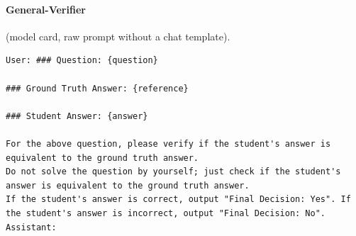 \documentclass[11pt]{article}
\begin{document}
\par\addvspace{2ex}\noindent\begin{minipage}{\columnwidth}
\paragraph{General-Verifier} (model card, raw prompt without a chat template).
\begin{Verbatim}[breaklines, breakanywhere, fontsize=\scriptsize, frame=single]
User: ### Question: {question}

### Ground Truth Answer: {reference}

### Student Answer: {answer}

For the above question, please verify if the student's answer is equivalent to the ground truth answer.
Do not solve the question by yourself; just check if the student's answer is equivalent to the ground truth answer.
If the student's answer is correct, output "Final Decision: Yes". If the student's answer is incorrect, output "Final Decision: No". Assistant:
\end{Verbatim}
\end{minipage}
\end{document}
